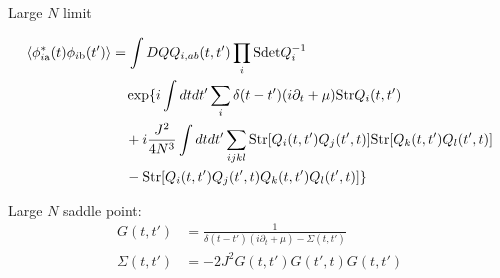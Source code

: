 \begin{frame}{Large $N$ limit}

\begin{equation*}
\begin{aligned}
    \langle \phi_{i{\rm a}}^{*}(t) \phi_{i{\rm b}}(t') \rangle &= \int DQ Q_{i, ab}(t, t') \prod _i {\rm Sdet}Q_i^{-1} \\
    &\quad \exp \{i \int dt dt' \sum_{i} \delta(t - t')(i\partial_{t} + \mu) {\rm Str} Q_i(t, t') \\
    &\quad + i \frac{J^2}{4 N^3} \int dt dt' \sum_{ijkl} {\rm Str} [Q_i(t, t') Q_j(t', t)] {\rm Str} [Q_k(t, t') Q_l(t', t)] \\
    &\quad - {\rm Str} [Q_i(t, t') Q_j(t', t) Q_k(t, t') Q_l(t', t)] \}
\end{aligned}
\end{equation*}

Large $N$ saddle point:
\begin{equation*}
\begin{aligned}
    G(t, t') &= \frac{1}{\delta(t - t') (i \partial_t + \mu) - \Sigma(t, t')} \\
    \Sigma(t, t') &= -2J^2 G(t, t') G(t', t) G(t, t')
\end{aligned}
\end{equation*}
\end{frame}
